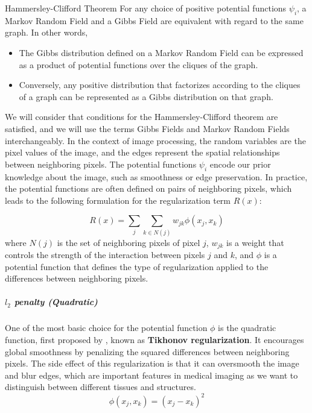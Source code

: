\begin{theorem}{Hammersley-Clifford Theorem}
    For any choice of positive potential functions $\psi_i$, a Markov Random Field and a Gibbs Field are equivalent with regard to the same graph.
    In other words,
    \begin{itemize}
        \item The Gibbs distribution defined on a Markov Random Field can be expressed as a product of potential functions over the cliques of the graph.
        \item Conversely, any positive distribution that factorizes according to the cliques of a graph can be represented as a Gibbs distribution on that graph.
    \end{itemize} 
\end{theorem}

We will consider that conditions for the Hammersley-Clifford theorem are satisfied, and we will use the terms Gibbs Fields and Markov Random Fields interchangeably.
In the context of image processing, the random variables are the pixel values of the image, and the edges represent the spatial relationships between neighboring pixels. The potential functions $\psi_i$ encode our prior knowledge about the image, such as smoothness or edge preservation.
In practice, the potential functions are often defined on pairs of neighboring pixels, which leads to the following formulation for the regularization term $R(x)$:

\begin{equation}
    R(x) = \sum_{j} \sum_{k \in N(j)} w_{jk} \phi(x_j, x_k)
    \label{eq:mrf}
\end{equation}
where $N(j)$ is the set of neighboring pixels of pixel $j$, $w_{jk}$ is a weight that controls the strength of the interaction between pixels $j$ and $k$, and $\phi$ is a potential function that defines the type of regularization applied to the differences between neighboring pixels.

\subparagraph{$l_2$ penalty (Quadratic)}

One of the most basic choice for the potential function $\phi$ is the quadratic function, first proposed by \cite{tikhonov1977solutions}, known as \textbf{Tikhonov regularization}. It encourages global smoothness by penalizing the squared differences between neighboring pixels. The side effect of this regularization is that it can oversmooth the image and blur edges, which are important features in medical imaging as we want to distinguish between different tissues and structures.
\begin{equation}
    \phi(x_j, x_k) = (x_j - x_k)^2
\end{equation}

